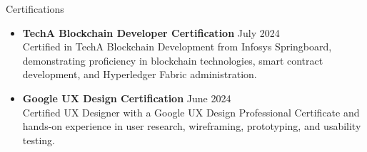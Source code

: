 \documentclass{resume} %
\begin{document}
\begin{rSection}{Certifications} 
        \begin{itemize}


            \item \textbf{TechA Blockchain Developer Certification} \hfill July 2024\\
            Certified in TechA Blockchain Development from Infosys Springboard, demonstrating proficiency in blockchain technologies, smart contract development, and Hyperledger Fabric administration.    
           
            \item \textbf{Google UX Design Certification} \hfill June 2024\\
            Certified UX Designer with a Google UX Design Professional Certificate and hands-on experience in user research, wireframing, prototyping, and usability testing. 



   

\end{itemize}
\end{rSection}
\end{document}
